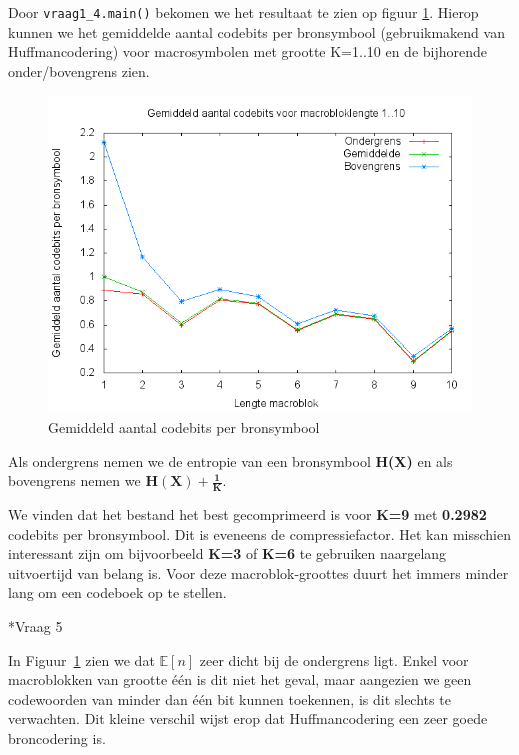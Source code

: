 \documentclass[]{article}
\begin{document}
\begin{section}
\begin{subsection}
	Door \texttt{vraag1\_4.main()} bekomen we het resultaat te zien op figuur \ref{fig:codebits}.
	Hierop kunnen we het gemiddelde aantal codebits per bronsymbool
        (gebruikmakend van Huffmancodering) voor macrosymbolen met
        grootte K=1..10 en de bijhorende onder/bovengrens zien.
        \begin{figure}[h]
            \centering
            \includegraphics[width=\textwidth]{vraag1_4.png}
            \caption{Gemiddeld aantal codebits per bronsymbool}
            \label{fig:codebits}
        \end{figure}

        Als ondergrens nemen we de entropie van een bronsymbool
        \textbf{H(X)} en als bovengrens nemen we
        $\mathbf{H(X) +\frac{1}{K}}$.

        We vinden dat het bestand het best gecomprimeerd is voor
        \textbf{K=9} met \textbf{0.2982} codebits per bronsymbool. Dit
        is eveneens de compressiefactor. Het kan misschien  interessant
        zijn om bijvoorbeeld \textbf{K=3} of \textbf{K=6} te gebruiken
        naargelang uitvoertijd van belang is. Voor deze
        macroblok-groottes duurt het immers minder lang om een codeboek
        op te stellen.
		
    \end{subsection}

    \begin{subsection}*{Vraag 5}

        In Figuur~\ref{fig:codebits} zien we dat $\mathbb{E}[n]$ zeer
        dicht bij de ondergrens ligt. Enkel voor macroblokken van
        grootte \'e\'en is dit niet het geval, maar aangezien we geen
        codewoorden van minder dan \'e\'en bit kunnen toekennen, is dit
        slechts te verwachten. Dit kleine verschil wijst erop dat
        Huffmancodering een zeer goede broncodering is.


\end{subsection}
\end{section}
\end{document}
